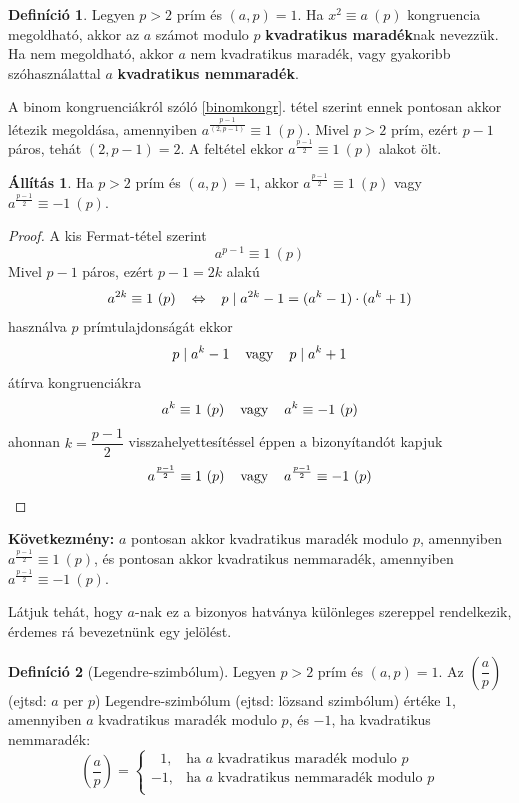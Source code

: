 \documentclass[12pt]{book}
\theoremstyle{plain} %
\theoremstyle{definition} %
\newtheorem{defi/}{Definíció}[section]
\newenvironment{defi}
  {\renewcommand{\qedsymbol}{$\clubsuit$}%
   \pushQED{\qed}\begin{defi/}}
  {\popQED\end{defi/}}
\newtheorem{all/}{Állítás}[section]
\newenvironment{all}
{\renewcommand{\qedsymbol}{$\clubsuit$}%
	\pushQED{\qed}\begin{all/}}
	{\popQED\end{all/}}
\theoremstyle{remark}
\renewcommand\qedsymbol{$\blacksquare$}
\numberwithin{equation}{section}  %
\begin{document}
	\begin{defi}
		Legyen $p>2$ prím és $(a,p)=1$. Ha $x^2\equiv a\ (p)$ kongruencia megoldható, akkor az $a$ számot modulo $p$ \textbf{kvadratikus maradék}nak nevezzük. Ha nem megoldható, akkor $a$ nem kvadratikus maradék, vagy gyakoribb szóhasználattal $a$ \textbf{kvadratikus nemmaradék}.
	\end{defi}
	
	A binom kongruenciákról szóló \ref{binomkongr}. tétel szerint ennek pontosan akkor létezik megoldása, amennyiben $a^{\frac{p-1}{(2,p-1)}} \equiv 1\ (p)$. Mivel $p>2$ prím, ezért $p-1$ páros, tehát $(2,p-1)=2$. A feltétel ekkor $a^{\frac{p-1}{2}} \equiv 1\ (p)$ alakot ölt.
	
	\begin{all}
		Ha $p>2$ prím és $(a,p)=1$, akkor $a^{\frac{p-1}{2}} \equiv 1\ (p)$ vagy $a^{\frac{p-1}{2}} \equiv -1\ (p)$.
	\end{all}

	\begin{proof}
		A kis Fermat-tétel szerint
		\[ a^{p-1} \equiv 1\ (p)  \]
		Mivel $p-1$ páros, ezért $p-1=2k$ alakú
		\[ a^{2k} \equiv 1\ (p) \hspace{3mm} \Leftrightarrow \hspace{3mm} p\mid a^{2k} - 1 = (a^k-1)\cdot (a^k+1) \]
		használva $p$ prímtulajdonságát ekkor
		\[ p\mid a^k-1 \hspace{4mm} \text{vagy} \hspace{4mm} p\mid a^k+1  \]
		átírva kongruenciákra
		\[ a^k\equiv 1\ (p) \hspace{4mm} \text{vagy} \hspace{4mm} a^k\equiv -1\ (p)  \]
		ahonnan $k=\dfrac{p-1}{2}$ visszahelyettesítéssel éppen a bizonyítandót kapjuk
		\[ a^{\frac{p-1}{2}} \equiv 1\ (p) \hspace{4mm} \text{vagy} \hspace{4mm} a^{\frac{p-1}{2}} \equiv - 1\ (p)  \]
	\end{proof}

	\textbf{Következmény:} $a$ pontosan akkor kvadratikus maradék modulo $p$, amennyiben $a^{\frac{p-1}{2}}\equiv 1\ (p)$, és pontosan akkor kvadratikus nemmaradék, amennyiben $a^{\frac{p-1}{2}}\equiv -1\ (p)$.
	
	Látjuk tehát, hogy $a$-nak ez a bizonyos hatványa különleges szereppel rendelkezik, érdemes rá bevezetnünk egy jelölést.
	
	\begin{defi}[Legendre-szimbólum]
		Legyen $p>2$ prím és $(a,p)=1$. Az $\left(\dfrac{a}{p}\right)$ (ejtsd: $a$ per $p$) Legendre-szimbólum (ejtsd: lözsand szimbólum) értéke $1$, amennyiben $a$ kvadratikus maradék modulo $p$, és $-1$, ha kvadratikus nemmaradék:
		\[ \left(\dfrac{a}{p}\right) = \begin{cases}
		\ \ \ 1, & \text{ha $a$ kvadratikus maradék modulo $p$} \\
		-1, & \text{ha $a$ kvadratikus nemmaradék modulo $p$} \\
		\end{cases} \]
	\end{defi}
\end{document}
